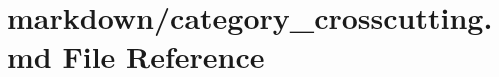 \hypertarget{category__crosscutting_8md}{}\section{markdown/category\+\_\+crosscutting.md File Reference}
\label{category__crosscutting_8md}
